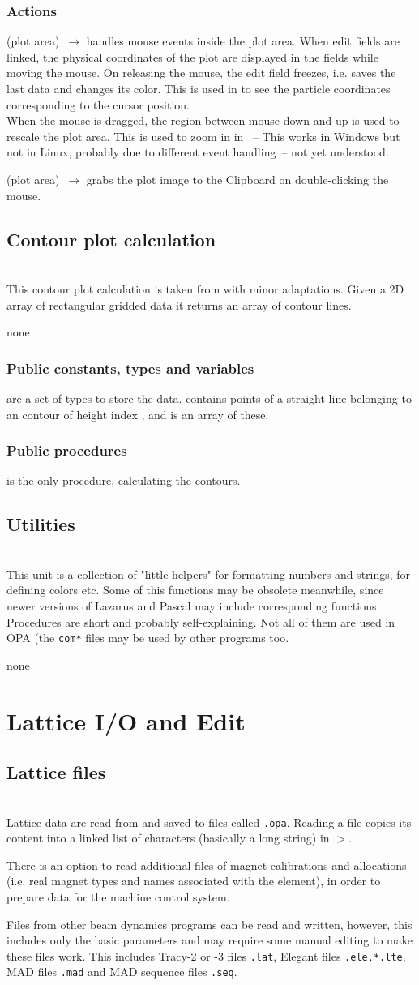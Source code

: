 \documentclass[12pt]{article}
\newcommand\code[1]{{\tt #1}}
\newcommand{\ofldx}[1]{\colorbox{black!15}{{\color{black}(#1)}}}
\newcommand\guico[1]{{\color{blue}\code{#1}}}
\newcommand\guifco[1]{{\color{violet}\code{#1}}}
\newcommand{\unico}[1]{{\color{burntorange}\code{#1}}}
\newcommand{\evcodxf}[2]{\ofldx{#1}~$\rightarrow$ \guifco{#2}}
\newcommand{\grcod}[2]{\opagui{#1}$>$\guico{#2}}
\newcommand{\opagui}[1]{\colorbox{blue!20}{{\color{black}\code{#1}}}}
\newcommand{\ogui}[1]{\hyperref[#1]{\opagui{#1}}}
\newcommand{\opauni}[1]{\colorbox{orange!30}{{\color{black}\code{#1}}}}
\newcommand{\ounih}[2]{\subsection{\label{#2}#1}{\Huge\opauni{#2}}\\}
\newcommand{\uses}[1]{\flushleft {\bf Uses:} #1}
\newcommand{\desc}[1]{#1}
\newcommand{\act}[1]{\subsubsection*{Actions} #1}
\newcommand{\pvar}[1]{\subsubsection*{Public constants, types and variables} #1}
\newcommand{\ppro}[1]{\subsubsection*{Public procedures} #1}
\newcommand{\todo}[1]{{\color{red} #1}}
\begin{document}
\act{
\evcodxf{plot area}{pMouseDown,pMouseMove,pMouseUp} handles mouse events inside the plot area.
When edit fields are linked, the physical coordinates of the plot are displayed in the fields while moving the mouse. On releasing the mouse, the edit field freezes, i.e. saves the last data and changes its color.
This is used in \ogui{opatrackps} %
to see the particle coordinates corresponding to the cursor position. \\
When the mouse is dragged, the region between mouse down and up is used to rescale the plot area. This is used to zoom in in \ogui{opageometry}~-- \todo{This works in Windows but not in Linux, probably due to different event handling~-- not yet understood.}

\evcodxf{plot area}{pDblClick} grabs the plot image to the Clipboard on double-clicking the mouse.
}



\ounih{Contour plot calculation}{comcontourlib}

\desc{This contour plot calculation is taken from \cite{CONRECT} with minor adaptations. Given a 2D array of rectangular gridded data it returns an array of contour lines.}

\uses{none}
\pvar{
\unico{Con...} are a set of types to store the data. \unico{ConLinesType} contains points of a straight line belonging to an contour of height index \unico{ih}, and \unico{ConLinesArray} is an array of these.
}
\ppro{
\unico{Conrec} is the only procedure, calculating the contours.}

\ounih{Utilities}{comauxlib}

\desc{This unit is a collection of "little helpers" for formatting numbers and strings, for defining colors etc. Some of this functions may be obsolete meanwhile, since newer versions of Lazarus and Pascal may include corresponding functions.
Procedures are short and probably self-explaining. Not all of them are used in OPA (the \code{com*} files may be used by other programs too.}

\uses{none}

\section{\label{secedit}Lattice I/O and Edit} 

\ounih{Lattice files}{latfilelib}

\desc{Lattice data are read from and saved to files called \code{*.opa}. Reading a file copies its content into a linked list of characters (basically a long string) in \grcod{opamenu}{ReadFile}.

There is an option to read additional files of magnet calibrations and allocations (i.e. real magnet types and names associated with the element), in order to prepare data for the machine control system.

Files from other beam dynamics programs can be read and written, however, this includes only the basic parameters and may require some manual editing to make these files work. This includes Tracy-2 or -3 files \code{*.lat}, Elegant files \code{*.ele,*.lte}, MAD files \code{*.mad} and MAD sequence files \code{*.seq}.
}
\end{document}
